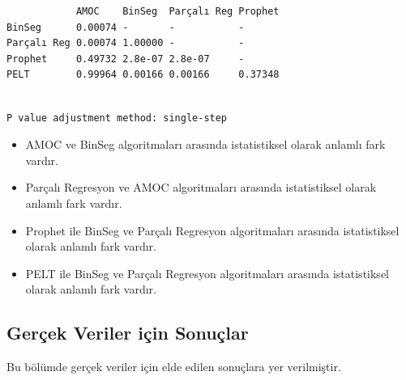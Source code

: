 \documentclass[12pt,twoside]{deuthesis}
\begin{document}
\begin{verbatim}
            AMOC    BinSeg  Parçalı Reg Prophet
BinSeg      0.00074 -       -           -      
Parçalı Reg 0.00074 1.00000 -           -      
Prophet     0.49732 2.8e-07 2.8e-07     -      
PELT        0.99964 0.00166 0.00166     0.37348
\end{verbatim}

\begin{verbatim}

P value adjustment method: single-step
\end{verbatim}

\begin{itemize}
    \item AMOC ve BinSeg algoritmaları arasında istatistiksel olarak anlamlı fark vardır.
    \item Parçalı Regresyon ve AMOC algoritmaları arasında istatistiksel olarak anlamlı fark vardır.
    \item Prophet ile BinSeg ve Parçalı Regresyon algoritmaları arasında istatistiksel olarak anlamlı fark vardır.
    \item PELT ile BinSeg ve Parçalı Regresyon algoritmaları arasında istatistiksel olarak anlamlı fark vardır.
\end{itemize}

\hypertarget{geruxe7ek-veriler-iuxe7in-sonuuxe7lar}{%
\subsection{Gerçek Veriler için Sonuçlar}\label{geruxe7ek-veriler-iuxe7in-sonuuxe7lar}}

Bu bölümde gerçek veriler için elde edilen sonuçlara yer verilmiştir.
\end{document}
